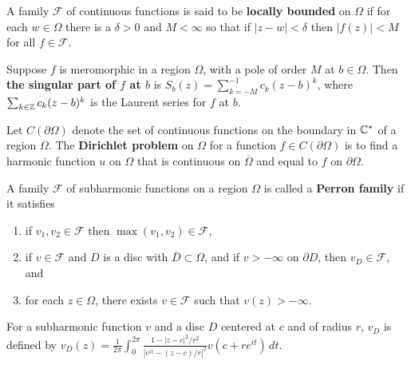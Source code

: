 \documentclass[12pt]{article}
\begin{document}
\begin{definition}
    A family $\mathcal{F}$ of continuous functions is said to be \textbf{locally bounded} on $\Omega$ if for each $w\in\Omega$ there is a $\delta>0$ and $M<\infty$ so that if $|z-w|<\delta$ then $|f(z)|<M$ for all $f\in\mathcal{F}$.
\end{definition}

\begin{definition}
    Suppose $f$ is meromorphic in a region $\Omega$, with a pole of order $M$ at $b\in\Omega$. Then \textbf{the singular part of $f$ at $b$} is $S_b(z)=\sum_{k=-M}^{-1}c_k(z-b)^k$, where $\sum_{k\in\mathbb{Z}} c_k(z-b)^k$ is the Laurent series for $f$ at $b$.
\end{definition}

\begin{definition}
    Let $C(\partial\Omega)$ denote the set of continuous functions on the boundary in $\mathbb{C}^*$ of a region $\Omega$. The \textbf{Dirichlet problem} on ${\Omega}$ for a function $f\in C(\partial\Omega)$ is to find a harmonic function $u$ on $\Omega$ that is continuous on $\overline{\Omega}$ and equal to $f$ on $\partial \Omega$. 
\end{definition}

\begin{definition}
    A family $\mathcal{F}$ of subharmonic functions on a region $\Omega$ is called a \textbf{Perron family} if it satisfies
    \begin{enumerate}[label=(\roman*)]
        \item if $v_1,v_2\in\mathcal{F}$ then $\max(v_1,v_2)\in\mathcal{F}$,
        \item if $v\in\mathcal{F}$ and $D$ is a disc with $\overline{D}\subset\Omega$, and if $v>-\infty$ on $\partial D$, then $v_D\in\mathcal{F}$, and
        \item for each $z\in\Omega$, there exists $v\in\mathcal{F}$ such that $v(z)>-\infty$.
    \end{enumerate}
\end{definition}
\begin{remark}
    For a subharmonic function $v$ and a disc $D$ centered at $c$ and of radius $r$, $v_D$ is defined by $v_D(z)=\frac{1}{2\pi}\int_0^{2\pi}\frac{1-|z-c|^2/r^2}{|e^{it}-(z-c)/r|^2}v(c+re^{it})\,dt$.
\end{remark}
\end{document}
